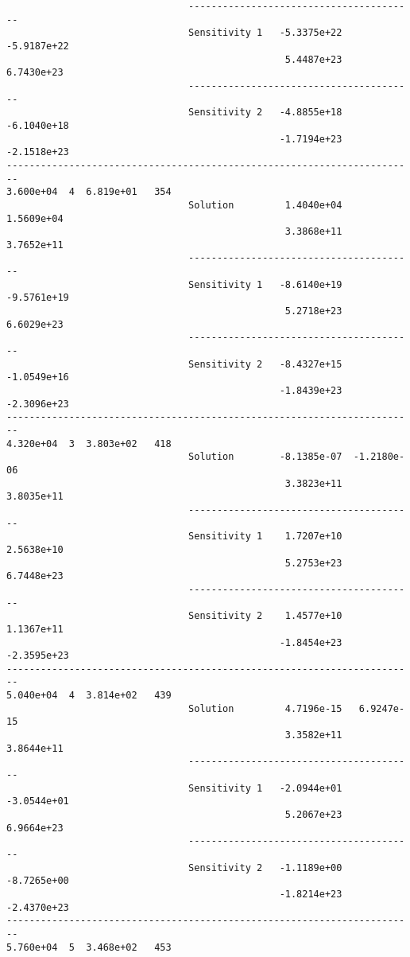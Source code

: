 \begin{verbatim}
                                ----------------------------------------
                                Sensitivity 1   -5.3375e+22  -5.9187e+22 
                                                 5.4487e+23   6.7430e+23 
                                ----------------------------------------
                                Sensitivity 2   -4.8855e+18  -6.1040e+18 
                                                -1.7194e+23  -2.1518e+23 
------------------------------------------------------------------------
3.600e+04  4  6.819e+01   354
                                Solution         1.4040e+04   1.5609e+04 
                                                 3.3868e+11   3.7652e+11 
                                ----------------------------------------
                                Sensitivity 1   -8.6140e+19  -9.5761e+19 
                                                 5.2718e+23   6.6029e+23 
                                ----------------------------------------
                                Sensitivity 2   -8.4327e+15  -1.0549e+16 
                                                -1.8439e+23  -2.3096e+23 
------------------------------------------------------------------------
4.320e+04  3  3.803e+02   418
                                Solution        -8.1385e-07  -1.2180e-06 
                                                 3.3823e+11   3.8035e+11 
                                ----------------------------------------
                                Sensitivity 1    1.7207e+10   2.5638e+10 
                                                 5.2753e+23   6.7448e+23 
                                ----------------------------------------
                                Sensitivity 2    1.4577e+10   1.1367e+11 
                                                -1.8454e+23  -2.3595e+23 
------------------------------------------------------------------------
5.040e+04  4  3.814e+02   439
                                Solution         4.7196e-15   6.9247e-15 
                                                 3.3582e+11   3.8644e+11 
                                ----------------------------------------
                                Sensitivity 1   -2.0944e+01  -3.0544e+01 
                                                 5.2067e+23   6.9664e+23 
                                ----------------------------------------
                                Sensitivity 2   -1.1189e+00  -8.7265e+00 
                                                -1.8214e+23  -2.4370e+23 
------------------------------------------------------------------------
5.760e+04  5  3.468e+02   453

\end{verbatim}
